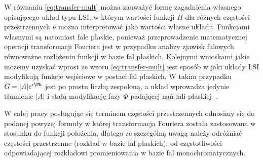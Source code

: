 W równaniu \ref{eq:transfer-mult} można zauważyć formę zagadnienia własnego opisującego układ typu LSI, w którym wartości funkcji $H$ dla różnych częstości przestrzennych $\nu$ można interpretować jako wartości własne układu. Funkcjami własnymi są natomiast fale płaskie, ponieważ przeprowadzenie matematycznej operacji transformacji Fouriera jest w przypadku analizy zjawisk falowych równoważne rozłożeniu funkcji w bazie fal płaskich.  Kolejnymi wnioskami jakie możemy uzyskać wprost ze wzoru \ref{eq:transfer-mult} jest sposób w jaki układy LSI modyfikują funkcje wejściowe w postaci fal płaskich. W takim przypadku $G=|A|e^{i\Ph}$ jest po prostu liczbą zespoloną, a układ wprowadza jedynie tłumienie $|A|$ i stałą modyfikację fazy $\Phi$ padającej nań fali płaskiej~\cite{citeulike:2926459}.

W całej pracy posługując się terminem częstości przestrzennych odnosimy się do podanej powyżej formuły w której transformacja Fouriera została zastosowana w stosunku do funkcji położenia, dlatego ze szczególną uwagą należy odróżniać częstości przestrzenne (rozkład w bazie fal płaskich), od częstotliwości odpowiadającej rozkładowi promieniowania w bazie fal monochromatycznych.

